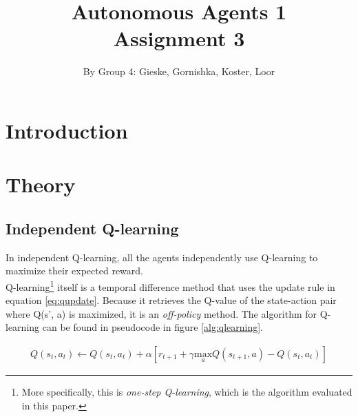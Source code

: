 \documentclass{article}
\begin{document}
\title{Autonomous Agents 1 \\ Assignment 3}

\author{By Group 4: Gieske, Gornishka, Koster, Loor}
\maketitle
\pagebreak
\tableofcontents


\pagebreak

\section{Introduction}



\pagebreak

\section{Theory}

\subsection{Independent Q-learning}
In independent Q-learning, all the agents independently use Q-learning to maximize their expected reward.  \\ 

\noindent Q-learning\footnote{More specifically, this is \textit{one-step Q-learning}, which is the algorithm evaluated in this paper.} itself is a temporal difference method that uses the update rule in equation \ref{eq:qupdate}. Because it retrieves the Q-value of the state-action pair where Q(s', a) is maximized, it is an \textit{off-policy} method. The algorithm for Q-learning can be found in pseudocode in figure \ref{alg:qlearning}.

\begin{mdframed}
\begin{align}
Q(s_t, a_t) \leftarrow Q(s_t,a_t) + \alpha \left[ r_{t+1} + \gamma \underset{a}{\text{max}} Q(s_{t+1},a) - Q(s_t,a_t)\right]\label{eq:qupdate}
\end{align}
\end{mdframed}
\end{document}
